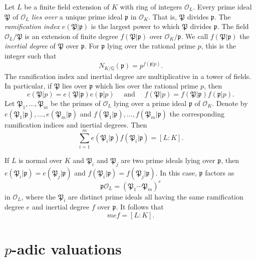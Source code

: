 Let $L$ be a finite field extension of $K$ with ring of integers $\mathcal{O}_L$. Every prime ideal $\mathfrak{P}$ of $\mathcal{O}_L$ \textit{lies over} a unique prime ideal $\mathfrak{p}$ in $\mathcal{O}_K$. That is, $\mathfrak{P}$ divides $\mathfrak{p}$. The \textit{ramification index} $e({\mathfrak{P}}|\mathfrak{p})$ is the largest power to which $\mathfrak{P}$ divides $\mathfrak{p}$. The field $\mathcal{O}_L/\mathfrak{P}$ is an extension of finite degree $f(\mathfrak{P}|\mathfrak{p})$ over $\mathcal{O}_K/\mathfrak{p}$. We call $f(\mathfrak{P}|\mathfrak{p})$ the \textit{inertial degree} of $\mathfrak{P}$ over $\mathfrak{p}$. For $\mathfrak{p}$ lying over the rational prime $p$, this is the integer such that 
\[N_{K/\mathbb{Q}}(\mathfrak{p}) = p^{f(\mathfrak{p}|p)}.\]
The ramification index and inertial degree are multiplicative in a tower of fields. In particular, if $\mathfrak{P}$ lies over $\mathfrak{p}$ which lies over the rational prime $p$, then
\[e({\mathfrak{P}}|p) = e({\mathfrak{P}}|\mathfrak{p})e({\mathfrak{p}}|p) \quad \text{ and } \quad f({\mathfrak{P}}|p) = f({\mathfrak{P}}|\mathfrak{p})f({\mathfrak{p}}|p).\]
Let $\mathfrak{P}_1, \dots, \mathfrak{P}_m$ be the primes of $\mathcal{O}_L$ lying over a prime ideal $\mathfrak{p}$ of $\mathcal{O}_K$. Denote by $e({\mathfrak{P}}_1|\mathfrak{p}),\dots, e({\mathfrak{P}}_m|\mathfrak{p})$ and $f({\mathfrak{P}}_1|\mathfrak{p}), \dots, f({\mathfrak{P}}_m|\mathfrak{p})$ the corresponding ramification indices and inertial degrees. Then
\[\sum_{i=1}^m e({\mathfrak{P}}_i|\mathfrak{p})f({\mathfrak{P}}_i|\mathfrak{p}) = [L:K].\]

If $L$ is normal over $K$ and $\mathfrak{P}_i$ and $\mathfrak{P}_j$ are two prime ideals lying over $\mathfrak{p}$, then $e({\mathfrak{P}}_i|\mathfrak{p}) = e({\mathfrak{P}}_j|\mathfrak{p})$ and $f({\mathfrak{P}}_i|\mathfrak{p}) = f({\mathfrak{P}}_j|\mathfrak{p})$. In this case, $\mathfrak{p}$ factors as
\[\mathfrak{p}\mathcal{O}_L = \left( \mathfrak{P}_1 \cdots \mathfrak{P}_m\right)^e\]
in $\mathcal{O}_L$, where the $\mathfrak{P}_i$ are distinct prime ideals all having the same ramification degree $e$ and inertial degree $f$ over $\mathfrak{p}$. It follows that 
\[mef = [L:K].\]


\section{$p$-adic valuations}
\label{sec:pAdicValuations}

